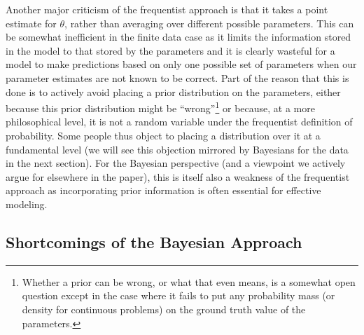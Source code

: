 Another major criticism of the frequentist approach is that it takes a point estimate for $\theta$, rather than averaging
over different possible parameters.  This can be somewhat inefficient in the finite data case as it limits the information
stored in the model to that stored by the parameters and it is clearly wasteful for a model to make predictions based on
only one possible set of parameters when our parameter estimates are not known to be correct.  Part of the reason that this
is done is to actively avoid placing a prior distribution on the parameters, either because this prior distribution might
be ``wrong''\footnote{Whether a prior can be wrong, or what that even means, is a somewhat open question except in the
	case where it fails to put any probability mass (or density for continuous problems) on the ground truth value of
	the parameters.} or because, at a more philosophical level, it is not a random variable under the frequentist definition
of probability.  Some people thus object to placing a distribution over it at a fundamental level (we will see this objection
mirrored by Bayesians for the data in the next section).  For the Bayesian perspective (and a viewpoint we actively 
argue for elsewhere in the paper), this is itself also a weakness of the frequentist approach as incorporating prior
information is often essential for effective modeling.


\subsection{Shortcomings of the Bayesian Approach}
\label{sec:bayes:religion:bayes}

